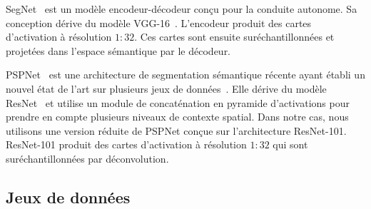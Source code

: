 SegNet~\cite{badrinarayanan_segnet:_2017} est un modèle encodeur-décodeur conçu pour la conduite autonome. Sa conception dérive du modèle VGG-16~\cite{simonyan_very_2014}. L'encodeur produit des cartes d'activation à résolution $1{:}32$. Ces cartes sont ensuite suréchantillonnées et projetées dans l'espace sémantique par le décodeur.

PSPNet~\cite{zhao_pyramid_2017} est une architecture de segmentation sémantique récente ayant établi un nouvel état de l'art sur plusieurs jeux de données~\cite{cordts_cityscapes_2016,everingham_pascal_2014}. Elle dérive du modèle ResNet~\cite{he_deep_2016} et utilise un module de concaténation en pyramide d'activations pour prendre en compte plusieurs niveaux de contexte spatial. Dans notre cas, nous utilisons une version réduite de PSPNet conçue sur l'architecture ResNet-101. ResNet-101 produit des cartes d'activation à résolution $1{:}32$ qui sont suréchantillonnées par déconvolution.

\subsection{Jeux de données}

